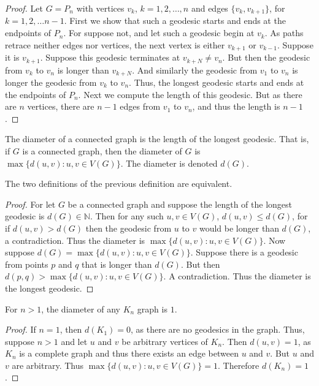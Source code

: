         \begin{proof}
        Let $G=P_n$ with vertices $v_k$, $k=1,2,\hdots, n$ and edges $\{v_k,v_{k+1}\}$, for $k=1,2,\hdots n-1$. First we show that such a geodesic starts and ends at the endpoints of $P_n$. For suppose not, and let such a geodesic begin at $v_k$. As paths retrace neither edges nor vertices, the next vertex is either $v_{k+1}$ or $v_{k-1}$. Suppose it is $v_{k+1}$. Suppose this geodesic terminates at $v_{k+N} \ne v_{n}$. But then the geodesic from $v_{k}$ to $v_{n}$ is longer than $v_{k+N}$. And similarly the geodesic from $v_1$ to $v_n$ is longer the geodesic from $v_k$ to $v_n$. Thus, the longest geodesic starts and ends at the endpoints of $P_n$. Next we compute the length of this geodesic. But as there are $n$ vertices, there are $n-1$ edges from $v_1$ to $v_n$, and thus the length is $n-1$.
        \end{proof}
        \begin{definition}
        The diameter of a connected graph is the length of the longest geodesic. That is, if $G$ is a connected graph, then the diameter of $G$ is $\max\{d(u,v): u,v\in V(G)\}$. The diameter is denoted $d(G)$.
        \end{definition}
        \begin{theorem}
        The two definitions of the previous definition are equivalent.
        \end{theorem}
        \begin{proof}
        For let $G$ be a connected graph and suppose the length of the longest geodesic is $d(G)\in \mathbb{N}$. Then for any such $u,v\in V(G)$, $d(u,v) \leq d(G)$, for if $d(u,v)> d(G)$ then the geodesic from $u$ to $v$ would be longer than $d(G)$, a contradiction. Thus the diameter is $\max\{d(u,v):u,v\in V(G)\}$. Now suppose $d(G) = \max\{d(u,v):u,v \in V(G)\}$. Suppose there is a geodesic from points $p$ and $q$ that is longer than $d(G)$. But then $d(p,q)>\max\{d(u,v):u,v\in V(G)\}$. A contradiction. Thus the diameter is the longest geodesic.
        \end{proof}
        \begin{theorem}
        For $n>1$, the diameter of any $K_n$ graph is $1$.
        \end{theorem}
        \begin{proof}
        If $n=1$, then $d(K_1) = 0$, as there are no geodesics in the graph. Thus, suppose $n>1$ and let $u$ and $v$ be arbitrary vertices of $K_n$. Then $d(u,v)=1$, as $K_n$ is a complete graph and thus there exists an edge between $u$ and $v$. But $u$ and $v$ are arbitrary. Thus $\max\{d(u,v):u,v\in V(G)\} = 1$. Therefore $d(K_n) = 1$.
        \end{proof}
